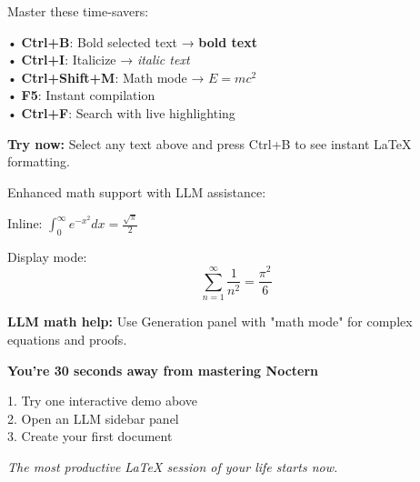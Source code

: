 \documentclass[12pt,a4paper]{article}
\begin{document}
\vspace{0.5cm}

\begin{tcolorbox}[colback=purple!8!white,colframe=purple!40!black,title=\textbf{Power User Shortcuts},left=5mm,right=5mm]
Master these time-savers:

• \textbf{Ctrl+B}: Bold selected text → \textbf{bold text} \\
• \textbf{Ctrl+I}: Italicize → \textit{italic text} \\
• \textbf{Ctrl+Shift+M}: Math mode → $E = mc^2$ \\
• \textbf{F5}: Instant compilation \\
• \textbf{Ctrl+F}: Search with live highlighting

\textbf{Try now:} Select any text above and press Ctrl+B to see instant LaTeX formatting.
\end{tcolorbox}

\vspace{0.5cm}

\begin{tcolorbox}[colback=teal!8!white,colframe=teal!40!black,title=\textbf{Math Mode Excellence},left=5mm,right=5mm]
Enhanced math support with LLM assistance:

Inline: $\int_0^\infty e^{-x^2} dx = \frac{\sqrt{\pi}}{2}$

Display mode:
\begin{equation}
\sum_{n=1}^{\infty} \frac{1}{n^2} = \frac{\pi^2}{6}
\end{equation}

\textbf{LLM math help:} Use Generation panel with "math mode" for complex equations and proofs.
\end{tcolorbox}

\vspace{0.8cm}

\begin{center}
\begin{tcolorbox}[colback=yellow!10!white,colframe=orange!60!black,title=\textbf{Ready to Explore?},width=0.8\textwidth]
\centering
\textbf{You're 30 seconds away from mastering Noctern}

1. Try one interactive demo above \\
2. Open an LLM sidebar panel \\
3. Create your first document

\vspace{0.3cm}
\textit{The most productive LaTeX session of your life starts now.}
\end{tcolorbox}
\end{center}
\end{document}
